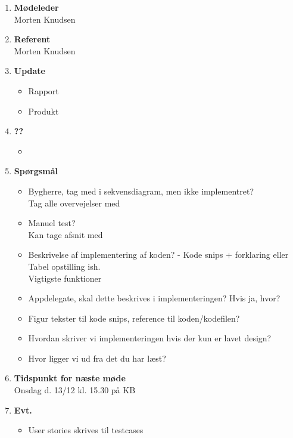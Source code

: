 	\begin{enumerate}
		\itemsep 0.3em 
		\item \textbf{Mødeleder}\\
			Morten Knudsen
		\item \textbf{Referent}\\
			Morten Knudsen

		\item \textbf{Update}
			\begin{itemize}[-]
				\item Rapport 
				\item Produkt
								
			\end{itemize}
		
		\item \textbf{??}
		\begin{itemize}[-]
			\item 
		\end{itemize}
			
		\item \textbf{Spørgsmål}
			\begin{itemize}[-]
				\item Bygherre, tag med i sekvensdiagram, men ikke implementret?\\
				Tag alle overvejelser med
				\item Manuel test? \\
				Kan tage afsnit med
				\item Beskrivelse af implementering af koden? - Kode snips + forklaring eller Tabel opstilling ish. \\
				Vigtigste funktioner
				\item Appdelegate, skal dette beskrives i implementeringen? Hvis ja, hvor?
				\item Figur tekster til kode snips, reference til koden/kodefilen?
				\item Hvordan skriver vi implementeringen hvis der kun er lavet design?
				\item Hvor ligger vi ud fra det du har læst?	
			\end{itemize}
	
		\item \textbf{Tidspunkt for næste møde} \\
			Onsdag d. 13/12 kl. 15.30 på KB \\
						
		\item \textbf{Evt.}
			\begin{itemize}[-]
				\item User stories skrives til testcases
				
			\end{itemize}
			
	\end{enumerate}
